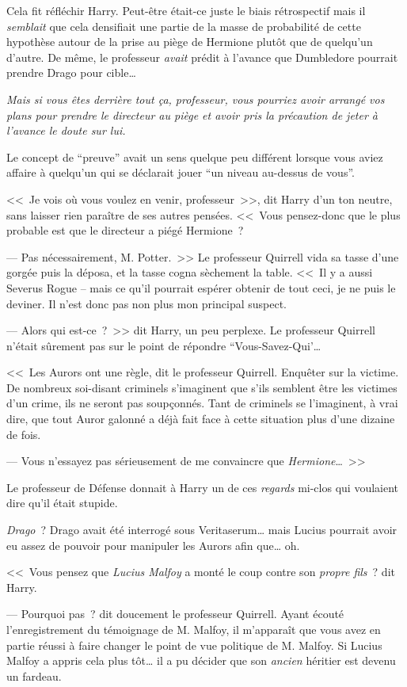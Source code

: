 Cela fit réfléchir Harry. Peut-être était-ce juste le biais rétrospectif mais il \emph{semblait} que cela densifiait une partie de la masse de probabilité de cette hypothèse autour de la prise au piège de Hermione plutôt que de quelqu'un d'autre. De même, le professeur \emph{avait} prédit à l'avance que Dumbledore pourrait prendre Drago pour cible…

\emph{Mais si vous êtes derrière tout ça, professeur, vous pourriez avoir arrangé vos plans pour prendre le directeur au piège et avoir pris la précaution de jeter à l'avance le doute sur lui.}

Le concept de “preuve” avait un sens quelque peu différent lorsque vous aviez affaire à quelqu'un qui se déclarait jouer “un niveau au-dessus de vous”.

<<~Je vois où vous voulez en venir, professeur~>>, dit Harry d'un ton neutre, sans laisser rien paraître de ses autres pensées. <<~Vous pensez-donc que le plus probable est que le directeur a piégé Hermione~?

--- Pas nécessairement, M. Potter.~>> Le professeur Quirrell vida sa tasse d'une gorgée puis la déposa, et la tasse cogna sèchement la table. <<~Il y a aussi Severus Rogue -- mais ce qu'il pourrait espérer obtenir de tout ceci, je ne puis le deviner. Il n'est donc pas non plus mon principal suspect.

--- Alors qui est-ce~?~>> dit Harry, un peu perplexe. Le professeur Quirrell n'était sûrement pas sur le point de répondre “Vous-Savez-Qui'…

<<~Les Aurors ont une règle, dit le professeur Quirrell. Enquêter sur la victime. De nombreux soi-disant criminels s'imaginent que s'ils semblent être les victimes d'un crime, ils ne seront pas soupçonnés. Tant de criminels se l'imaginent, à vrai dire, que tout Auror galonné a déjà fait face à cette situation plus d'une dizaine de fois.

--- Vous n'essayez pas sérieusement de me convaincre que \emph{Hermione}…~>>

Le professeur de Défense donnait à Harry un de ces \emph{regards} mi-clos qui voulaient dire qu'il était stupide.

\emph{Drago}~? Drago avait été interrogé sous Veritaserum… mais Lucius pourrait avoir eu assez de pouvoir pour manipuler les Aurors afin que… oh.

<<~Vous pensez que \emph{Lucius Malfoy} a monté le coup contre son \emph{propre fils}~? dit Harry.

--- Pourquoi pas~? dit doucement le professeur Quirrell. Ayant écouté l'enregistrement du témoignage de M. Malfoy, il m'apparaît que vous avez en partie réussi à faire changer le point de vue politique de M. Malfoy. Si Lucius Malfoy a appris cela plus tôt… il a pu décider que son \emph{ancien} héritier est devenu un fardeau.

